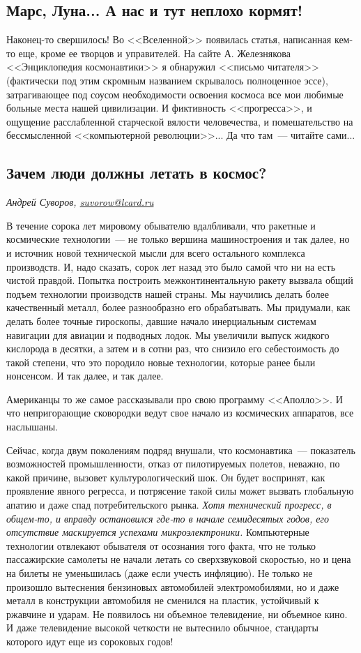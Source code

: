 \documentclass{scrbook}
\newcommand{\flqq}{<<}
\newcommand{\frqq}{>>}
\newcommand{\mdash}{~--- }
\newcommand{\essaysection}[1]{\subsection*{#1}\nopagebreak}
\newcommand{\inlineauthor}[1]{\emph{#1}}
\begin{document}
\essaysection{Марс, Луна... А нас и тут неплохо кормят!}

Наконец-то свершилось! Во {\flqq}Вселенной{\frqq} появилась статья, написанная кем-то еще, кроме ее творцов и управителей. На сайте А. Железнякова {\flqq}Энциклопедия космонавтики{\frqq} я обнаружил {\flqq}письмо читателя{\frqq} (фактически под этим скромным названием скрывалось полноценное эссе), затрагивающее под соусом необходимости освоения космоса все мои любимые больные места нашей цивилизации. И фиктивность {\flqq}прогресса{\frqq}, и ощущение расслабленной старческой вялости человечества, и помешательство на бессмысленной {\flqq}компьютерной революции{\frqq}... Да что там{\mdash}читайте сами...

\essaysection{Зачем люди должны летать в космос?}
\inlineauthor{Андрей Суворов, \url{suvorow@lcard.ru}}
\nopagebreak
\singlespacing
\nopagebreak

В течение сорока лет мировому обывателю вдалбливали, что ракетные и космические технологии{\mdash}не только вершина машиностроения и так далее, но и источник новой технической мысли для всего остального комплекса производств. И, надо сказать, сорок лет назад это было самой что ни на есть чистой правдой. Попытка построить межконтинентальную ракету вызвала общий подъем технологии производств нашей страны. Мы научились делать более качественный металл, более разнообразно его обрабатывать. Мы придумали, как делать более точные гироскопы, давшие начало инерциальным системам навигации для авиации и подводных лодок. Мы увеличили выпуск жидкого кислорода в десятки, а затем и в сотни раз, что снизило его себестоимость до такой степени, что это породило новые технологии, которые ранее были нонсенсом. И так далее, и так далее.

Американцы то же самое рассказывали про свою программу {\flqq}Аполло{\frqq}. И что непригорающие сковородки ведут свое начало из космических аппаратов, все наслышаны.

Сейчас, когда двум поколениям подряд внушали, что космонавтика{\mdash}показатель возможностей промышленности, отказ от пилотируемых полетов, неважно, по какой причине, вызовет культурологический шок. Он будет воспринят, как проявление явного регресса, и потрясение такой силы может вызвать глобальную апатию и даже спад потребительского рынка. \emph{Хотя технический прогресс, в общем-то, и вправду остановился где-то в начале семидесятых годов, его отсутствие маскируется успехами микроэлектроники.} Компьютерные технологии отвлекают обывателя от осознания того факта, что не только пассажирские самолеты не начали летать со сверхзвуковой скоростью, но и цена на билеты не уменьшилась (даже если учесть инфляцию). Не только не произошло вытеснения бензиновых автомобилей электромобилями, но и даже металл в конструкции автомобиля не сменился на пластик, устойчивый к ржавчине и ударам. Не появилось ни объемное телевидение, ни объемное кино. И даже телевидение высокой четкости не вытеснило обычное, стандарты которого идут еще из сороковых годов!
\end{document}
